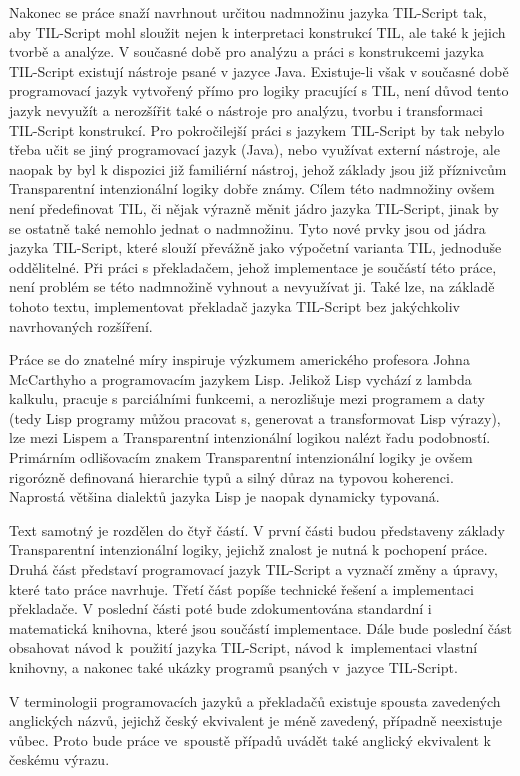 Nakonec se práce snaží navrhnout určitou nadmnožinu jazyka TIL-Script tak, aby TIL-Script mohl
sloužit nejen k interpretaci konstrukcí TIL, ale také k jejich tvorbě a analýze. V současné době
pro analýzu a práci s konstrukcemi jazyka TIL-Script existují nástroje psané v jazyce Java.
Existuje-li však v současné době programovací jazyk vytvořený přímo pro logiky pracující s TIL,
není důvod tento jazyk nevyužít a nerozšířit také o nástroje pro analýzu, tvorbu i transformaci
TIL-Script konstrukcí. Pro pokročilejší práci s jazykem TIL-Script by tak nebylo třeba učit se jiný
programovací jazyk (Java), nebo využívat externí nástroje, ale naopak by byl k dispozici již
familiérní nástroj, jehož základy jsou již příznivcům Transparentní intenzionální logiky dobře
známy. Cílem této nadmnožiny ovšem není předefinovat TIL, či nějak výrazně měnit jádro jazyka
TIL-Script, jinak by se ostatně také nemohlo jednat o nadmnožinu. Tyto nové prvky jsou od jádra
jazyka TIL-Script, které slouží převážně jako výpočetní varianta TIL, jednoduše oddělitelné. Při
práci s překladačem, jehož implementace je součástí této práce, není problém se této nadmnožině
vyhnout a nevyužívat ji. Také lze, na základě tohoto textu, implementovat překladač jazyka
TIL-Script bez jakýchkoliv navrhovaných rozšíření.

Práce se do znatelné míry inspiruje výzkumem amerického profesora Johna McCarthyho a programovacím
jazykem Lisp\cite{lisp-src}. Jelikož Lisp vychází z lambda kalkulu, pracuje s parciálními funkcemi,
a nerozlišuje mezi programem a daty (tedy Lisp programy můžou pracovat s, generovat a transformovat
Lisp výrazy), lze mezi Lispem a Transparentní intenzionální logikou nalézt řadu podobností.
Primárním odlišovacím znakem Transparentní intenzionální logiky je ovšem rigorózně definovaná
hierarchie typů a silný důraz na typovou koherenci. Naprostá většina dialektů jazyka Lisp je naopak
dynamicky typovaná.

Text samotný je rozdělen do čtyř částí. V první části budou představeny základy Transparentní
intenzionální logiky, jejichž znalost je nutná k pochopení práce. Druhá část představí programovací
jazyk TIL-Script a vyznačí změny a úpravy, které tato práce navrhuje. Třetí část popíše technické
řešení a implementaci překladače. V poslední části poté bude zdokumentována standardní i
matematická knihovna, které jsou součástí implementace. Dále bude poslední část obsahovat návod
k~použití jazyka TIL-Script, návod k~implementaci vlastní knihovny, a nakonec také ukázky programů
psaných v~jazyce TIL-Script.

V terminologii programovacích jazyků a překladačů existuje spousta zavedených anglických názvů,
jejichž český ekvivalent je méně zavedený, případně neexistuje vůbec. Proto bude práce ve~spoustě
případů uvádět také anglický ekvivalent k českému výrazu.

\endinput
